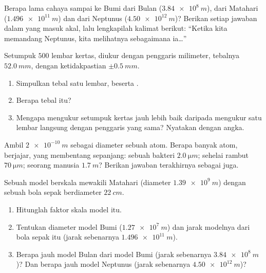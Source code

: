 \begin{exercise}[$\star\star$]\label{exo:g10:orders-of-magnitude:7}
Berapa lama cahaya sampai ke Bumi dari Bulan ($\qty{3.84e8}{m}$), dari
Matahari ($\qty{1.496e11}{m}$) dan dari Neptunus ($\qty{4.50e12}{m}$)?
Berikan setiap jawaban dalam  yang masuk akal, lalu lengkapilah
kalimat berikut: ``Ketika kita memandang Neptunus, kita melihatnya
sebagaimana ia\dots''
\end{exercise}

\begin{exercise}[$\star\star$]\label{exo:g10:orders-of-magnitude:8}
Setumpuk $500$ lembar kertas, diukur dengan penggaris milimeter,
tebalnya $\qty{52.0}{mm}$, dengan ketidakpastian $\pm\qty{0.5}{mm}$.
\begin{enumerate}
  \item Simpulkan tebal satu lembar, beserta .
  \item Berapa  tebal itu?
  \item Mengapa mengukur setumpuk kertas jauh lebih baik daripada
        mengukur satu lembar langsung dengan penggaris yang sama?
        Nyatakan dengan angka.
\end{enumerate}
\end{exercise}

\begin{exercise}[$\star\star$]\label{exo:g10:orders-of-magnitude:9}
Ambil $\qty{2e-10}{m}$ sebagai diameter sebuah atom. Berapa banyak atom,
berjajar, yang membentang sepanjang: sebuah bakteri
$\qty{2.0}{\micro m}$; sehelai rambut $\qty{70}{\micro m}$; seorang
manusia $\qty{1.7}{m}$? Berikan jawaban terakhirnya sebagai 
juga.
\end{exercise}

\begin{exercise}[$\star\star$]\label{exo:g10:orders-of-magnitude:10}
Sebuah model berskala mewakili Matahari (diameter $\qty{1.39e9}{m}$)
dengan sebuah bola sepak berdiameter $\qty{22}{cm}$.
\begin{enumerate}
  \item Hitunglah faktor skala model itu.
  \item Tentukan diameter model Bumi ($\qty{1.27e7}{m}$) dan jarak
        modelnya dari bola sepak itu (jarak sebenarnya
        $\qty{1.496e11}{m}$).
  \item Berapa jauh model Bulan dari model Bumi (jarak sebenarnya
        $\qty{3.84e8}{m}$)? Dan berapa jauh model Neptunus (jarak
        sebenarnya $\qty{4.50e12}{m}$)?
\end{enumerate}
\end{exercise}

